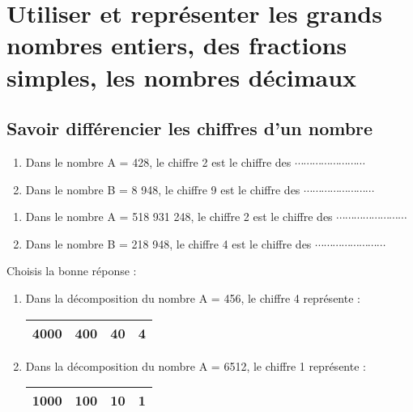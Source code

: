 









\section{Utiliser et représenter les grands nombres entiers, des fractions simples, les nombres décimaux}

\subsection{Savoir différencier les chiffres d'un nombre}

\begin{enumerate}
\item Dans le nombre A = 428, le chiffre 2 est le chiffre des $\cdots\cdots\cdots\cdots\cdots\cdots\cdots\cdots$
\item Dans le nombre B = 8 948, le chiffre 9 est le chiffre des $\cdots\cdots\cdots\cdots\cdots\cdots\cdots\cdots$
\end{enumerate}



\begin{enumerate}
\item Dans le nombre A = 518 931 248, le chiffre 2 est le chiffre des $\cdots\cdots\cdots\cdots\cdots\cdots\cdots\cdots$
\item Dans le nombre B = 218 948, le chiffre 4 est le chiffre des $\cdots\cdots\cdots\cdots\cdots\cdots\cdots\cdots$
\end{enumerate}




Choisis la bonne réponse :
\begin{enumerate}
\item Dans la décomposition du nombre A = 456, le chiffre 4 représente :
\begin{tabular}{|c|c|c|c|}
\hline 
4000 & 400 & 40 & 4 \\ 
\hline 
\end{tabular}  

\item Dans la décomposition du nombre A = 6512, le chiffre 1 représente :
\begin{tabular}{|c|c|c|c|}
\hline 
1000 & 100 & 10 & 1 \\ 
\hline 
\end{tabular} 
\end{enumerate}


